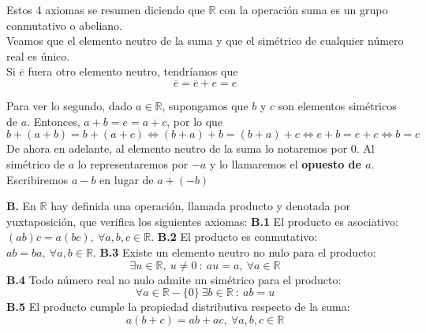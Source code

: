 Estos 4 axiomas se resumen diciendo que $\mathbb{R}$ con la operación suma es un grupo conmutativo o abeliano.\\

Veamos que el elemento neutro de la suma y que el simétrico de cualquier número real es único.\\

Si $\overline{e}$ fuera otro elemento neutro, tendríamos que
\begin{equation*}
    \overline{e} = \overline{e} + e = e
\end{equation*}

Para ver lo segundo, dado $a \in \mathbb{R}$, supongamos que $b$ y $c$ son elementos simétricos de $a$.
Entonces, $a+b=e=a+c$, por lo que
\begin{equation*}
    b+(a+b)=b+(a+c) \Longleftrightarrow (b+a)+b=(b+a)+c \Longleftrightarrow e+b=e+c \Longleftrightarrow b=c
\end{equation*}
De ahora en adelante, al elemento neutro de la suma lo notaremos por $0$. Al simétrico de $a$ lo representaremos por $-a$ y lo llamaremos el \textbf{opuesto de $a$}. Escribiremos $a-b$ en lugar de $a+(-b)$

\vspace{1.3cm}
\textbf{B.}\label{Axioma_B} En $\mathbb{R}$ hay definida una operación, llamada producto y denotada por yuxtaposición,
que verifica los siguientes axiomas:
\newline
\newline
\hspace*{1cm} \textbf{B.1} El producto es asociativo: $(ab)c=a(bc), ~\forall a,b,c \in \mathbb{R}$.
\newline
\newline
\hspace*{1cm} \textbf{B.2} El producto es conmutativo: $ab=ba, ~\forall a,b \in \mathbb{R}$.
\newline
\hspace*{1cm} \textbf{B.3} Existe un elemento neutro no nulo para el producto:
\begin{equation*}
    \exists u \in \mathbb{R}, ~u \neq 0 ~:~au=a,~ \forall a \in \mathbb{R}
\end{equation*}
\hspace*{1cm} \textbf{B.4} Todo número real no nulo admite un simétrico para el producto:
\begin{equation*}
    \forall a \in \mathbb{R}-\{0\}~ \exists b \in \mathbb{R} ~:~ab=u
\end{equation*}
\hspace*{1cm} \textbf{B.5} El producto cumple la propiedad distributiva respecto  de la suma:
\begin{equation*}
    a(b+c)=ab+ac, ~\forall a,b,c \in \mathbb{R}
\end{equation*}


